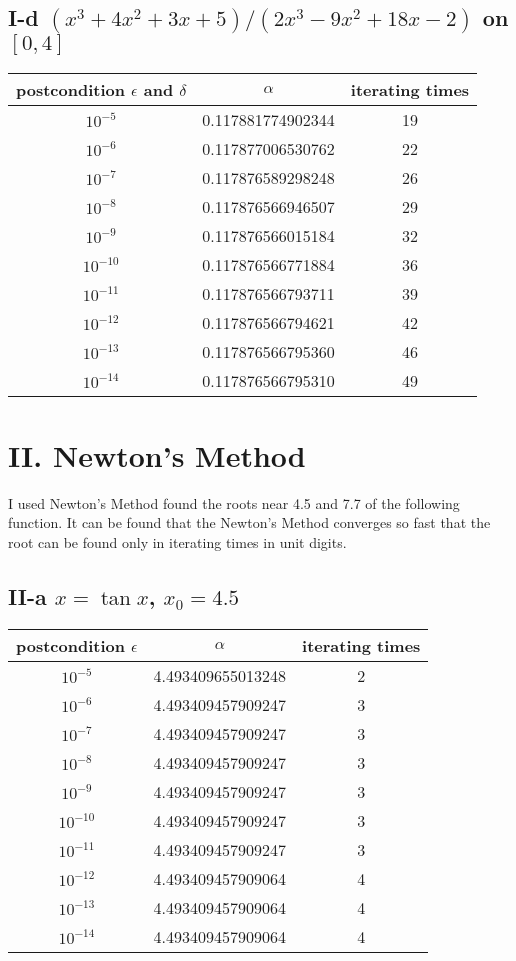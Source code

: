 \documentclass[twoside,a4paper]{article}
\begin{document}
\subsection*{I-d \small{$\left( x^{3} + 4x^2+3x+5 \right)
/\left( 2x^{3}-9x^2+18x-2 \right) $ on $[0,4]$}}
\begin{tabular}{|c|c|c|}
\hline
postcondition  $\epsilon$ and $\delta$  & $\alpha$  & iterating times\\
\hline
$10^{-5}$ & 0.117881774902344 & 19\\
\hline
$10^{-6}$ & 0.117877006530762 & 22\\
\hline
$10^{-7}$ & 0.117876589298248 & 26\\
\hline
$10^{-8}$ & 0.117876566946507 & 29\\
\hline
$10^{-9}$ & 0.117876566015184 & 32\\
\hline
$10^{-10}$ & 0.117876566771884 & 36\\
\hline
$10^{-11}$ & 0.117876566793711 & 39\\
\hline
$10^{-12}$ & 0.117876566794621 & 42\\
\hline
$10^{-13}$ & 0.117876566795360 & 46\\
\hline
$10^{-14}$ & 0.117876566795310 & 49\\
\hline
\end{tabular}

\section*{II. \small{Newton's Method}}

I used Newton's Method found the roots near 4.5 and 7.7 
of the following function.
It can be found that the Newton's Method converges so fast that
the root can be found only in iterating times in unit digits.
\subsection*{II-a \small{$x = \tan x$,  $x_0 = 4.5$}}
\begin{tabular}{|c|c|c|}
\hline
postcondition  $\epsilon$  & $\alpha$  & iterating times\\
\hline
$10^{-5}$ & 4.493409655013248 & 2\\
\hline
$10^{-6}$ & 4.493409457909247 & 3\\
\hline
$10^{-7}$ & 4.493409457909247 & 3\\
\hline
$10^{-8}$ & 4.493409457909247 & 3\\
\hline
$10^{-9}$ & 4.493409457909247 & 3\\
\hline
$10^{-10}$ & 4.493409457909247 & 3\\
\hline
$10^{-11}$ & 4.493409457909247 & 3\\
\hline
$10^{-12}$ & 4.493409457909064 & 4\\
\hline
$10^{-13}$ & 4.493409457909064 & 4\\
\hline
$10^{-14}$ & 4.493409457909064 & 4\\
\hline
\end{tabular}
\end{document}
